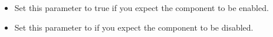 \begin{itemize}
\item Set this parameter to true if you expect the component to be enabled.
\item Set this parameter to \gdrefbooleanfalse if you expect the component to be disabled.
\end{itemize}
